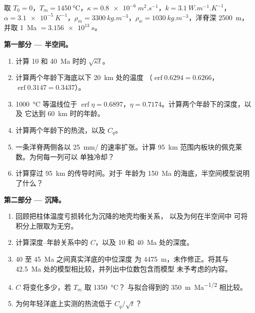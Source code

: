 \begin{problem}
\label{pb:b3:lithosphere-thermal-models:1}
取 $T_0 = 0$，$T_m = \qty{1450}{\celsius}$，$\kappa =
\qty{0.8e-6}{m^2.s^{-1}}$，$k = \qty{3.1}{W.m^{-1}.K^{-1}}$，$\alpha =
\qty{3.1e-5}{K^{-1}}$，$\rho_m = \qty{3300}{kg.m^{-3}}$，$\rho_w =
\qty{1030}{kg.m^{-3}}$，洋脊深 \qty{2500}{m}，并取 \qty{1}{Ma} $=
\qty{3.156e13}{s}$。

\medskip\noindent\textbf{第一部分 --- 半空间。}
\begin{enumerate}
  \item 计算 10 和 \qty{40}{Ma} 时的 $\sqrt{\kappa t}$。
  \item 计算两个年龄下海底以下 \qty{20}{km} 处的温度
        （$\operatorname{erf}0.6294 = 0.6266$，$\operatorname{erf}0.3147 =
        0.3437$）。
  \item \qty{1000}{\celsius} 等温线位于 $\operatorname{erf}\eta =
        0.6897$，$\eta = 0.7174$。计算两个年龄下的深度，以及
        它达到 \qty{60}{km} 时的年龄。
  \item 计算两个年龄下的热流，以及 $C_q$。
  \item 一条洋脊两侧各以 \qty{25}{mm/} 的速率扩张。计算
        \qty{95}{km} 范围内板块的佩克莱数。为何每一列可以
        单独冷却？
  \item 计算穿过 \qty{95}{km} 的传导时间。对于
        年龄为 \qty{150}{Ma} 的海底，半空间模型说明了什么？
\end{enumerate}

\medskip\noindent\textbf{第二部分 --- 沉降。}
\begin{enumerate}[resume]
  \item 回顾把柱体温度亏损转化为沉降的地壳均衡关系，
        以及为何在半空间中
        可将积分上限取为无穷。
  \item 计算深度–年龄关系中的 $C$，以及 10 和
        \qty{40}{Ma} 处的深度。
  \item 40 至 \qty{45}{Ma} 之间真实洋底的中位深度
        为 \qty{4475}{m}，未作修正。将其与 \qty{42.5}{Ma}
        处的模型相比较，并列出中位数包含而模型
        未予考虑的内容。
  \item $C$ 将变化多少，若 $T_m$ 取 \qty{1350}{\celsius}？
        与拟合得到的 \qty{350}{m.Ma^{-1/2}} 相比较。
  \item 为何年轻洋底上实测的热流低于 $C_q/\sqrt t$？
\end{enumerate}


\end{problem}
